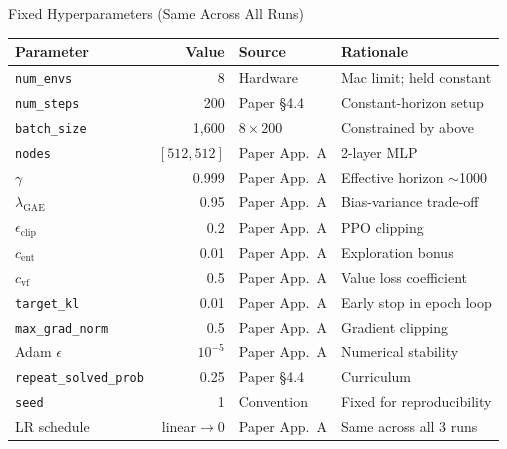 \documentclass[aspectratio=169,11pt]{beamer}
\begin{document}
\begin{frame}{Fixed Hyperparameters (Same Across All Runs)}
  \footnotesize
  \begin{center}
  \begin{tabular}{lrll}
    \toprule
    \textbf{Parameter} & \textbf{Value} & \textbf{Source} & \textbf{Rationale} \\
    \midrule
    \texttt{num\_envs}    & 8       & Hardware     & Mac limit; held constant \\
    \texttt{num\_steps}   & 200     & Paper \S4.4  & Constant-horizon setup \\
    \texttt{batch\_size}  & 1{,}600 & $8 \times 200$ & Constrained by above \\
    \texttt{nodes}        & $[512, 512]$ & Paper App.\ A & 2-layer MLP \\
    $\gamma$              & 0.999   & Paper App.\ A & Effective horizon $\sim$1000 \\
    $\lambda_\text{GAE}$  & 0.95    & Paper App.\ A & Bias-variance trade-off \\
    $\epsilon_\text{clip}$& 0.2     & Paper App.\ A & PPO clipping \\
    $c_\text{ent}$        & 0.01    & Paper App.\ A & Exploration bonus \\
    $c_\text{vf}$         & 0.5     & Paper App.\ A & Value loss coefficient \\
    \texttt{target\_kl}   & 0.01    & Paper App.\ A & Early stop in epoch loop \\
    \texttt{max\_grad\_norm}& 0.5   & Paper App.\ A & Gradient clipping \\
    Adam $\epsilon$       & $10^{-5}$& Paper App.\ A & Numerical stability \\
    \texttt{repeat\_solved\_prob} & 0.25 & Paper \S4.4 & Curriculum \\
    \texttt{seed}         & 1       & Convention   & Fixed for reproducibility \\
    LR schedule           & linear$\to$0 & Paper App.\ A & Same across all 3 runs \\
    \bottomrule
  \end{tabular}
  \end{center}
\end{frame}
\end{document}
